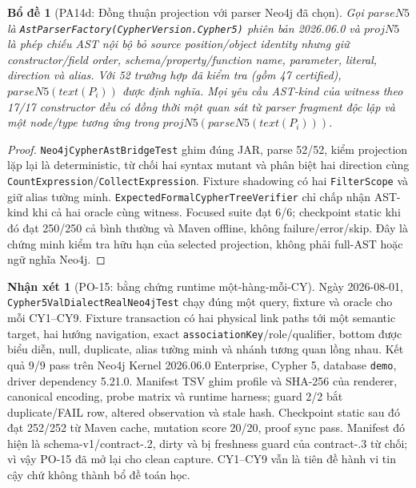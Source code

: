 \documentclass[11pt,a4paper]{article}
\newtheorem{lemma}{Bổ đề}
\theoremstyle{definition}
\newtheorem{remark}{Nhận xét}
\begin{document}
\begin{lemma}[PA14d: Đồng thuận projection với parser Neo4j đã chọn]
Gọi $parseN5$ là \texttt{AstParserFactory(CypherVersion.Cypher5)} phiên bản
2026.06.0 và $projN5$ là phép chiếu AST nội bộ bỏ source position/object identity
nhưng giữ constructor/field order, schema/property/function name, parameter,
literal, direction và alias. Với 52 trường hợp đã kiểm tra (gồm 47 certified),
$parseN5(text(P_i))$ được định nghĩa. Mọi yêu cầu AST-kind của witness theo
17/17 constructor đều có đồng thời một quan sát từ parser fragment độc lập và
một node/type tương ứng trong $projN5(parseN5(text(P_i)))$.
\end{lemma}
\begin{proof}
\texttt{Neo4jCypherAstBridgeTest} ghim đúng JAR, parse 52/52, kiểm projection lặp
lại là deterministic, từ chối hai syntax mutant và phân biệt hai direction cùng
\texttt{CountExpression}/\texttt{CollectExpression}. Fixture shadowing có hai
\texttt{FilterScope} và giữ alias tường minh. \texttt{ExpectedFormalCypherTreeVerifier}
chỉ chấp nhận AST-kind khi cả hai oracle cùng witness. Focused suite đạt 6/6;
checkpoint static khi đó đạt 250/250 cả bình thường và Maven offline, không
failure/error/skip. Đây là chứng minh kiểm
tra hữu hạn của selected projection, không phải full-AST hoặc ngữ nghĩa Neo4j.
\end{proof}

\begin{remark}[PO-15: bằng chứng runtime một-hàng-mỗi-CY]
Ngày 2026-08-01, \texttt{Cypher5ValDialectRealNeo4jTest} chạy đúng một query,
fixture và oracle cho mỗi CY1--CY9. Fixture transaction có hai physical link
paths tới một semantic target, hai hướng navigation, exact
\texttt{associationKey}/role/qualifier, bottom được biểu diễn, null, duplicate,
alias tường minh và nhánh tương quan lồng nhau. Kết quả 9/9 pass trên Neo4j
Kernel 2026.06.0 Enterprise, Cypher 5, database \texttt{demo}, driver dependency
5.21.0. Manifest TSV ghim profile và SHA-256 của renderer, canonical encoding,
probe matrix và runtime harness; guard 2/2 bắt duplicate/FAIL row, altered
observation và stale hash.
Checkpoint static sau đó đạt 252/252 từ Maven cache, mutation score
20/20, proof sync pass. Manifest đó hiện là schema-v1/contract-.2, dirty và bị
freshness guard của contract-.3 từ chối; vì vậy PO-15 đã mở lại cho clean capture.
CY1--CY9 vẫn là tiên đề hành vi tin cậy chứ không thành bổ đề toán học.
\end{remark}
\end{document}
